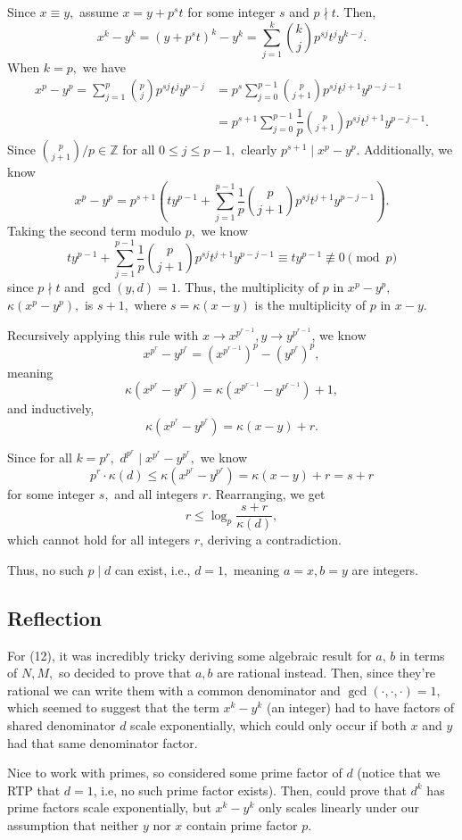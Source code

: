 \documentclass[12pt]{article}
\begin{document}
\begin{enumerate}
    Since $x \equiv y,$ assume $x = y + p^s t$ for some integer $s$
    and $p \nmid t.$ Then, $$x^k - y^k = (y + p^st)^k - y^k = \sum_{j
    = 1}^{k}{k \choose j}p^{sj}t^j y^{k -j}.$$
    When $k = p,$ we have
    \begin{align*}
      x^p - y^p = \sum_{j = 1}^{p}{p \choose j} p^{sj} t^j y^{p -j}
      &= p^{s} \sum_{j = 0}^{p - 1}{p \choose j + 1} p^{sj} t^{j + 1}
      y^{p-j - 1} \\
      &= p^{s+1} \sum_{j = 0}^{p-1} \dfrac{1}p{}{p \choose j + 1}
      p^{sj} t^{j + 1} y^{p -j - 1}.
    \end{align*}
    Since ${p \choose j + 1} / p \in \mathbb Z$ for all $0 \leq j
    \leq p - 1,$ clearly $p^{s + 1} \mid x^p - y^p.$ Additionally, we know
    $$
    x^p -y^p = p^{s + 1} \left (
      ty^{p-1} + \sum_{j = 1}^{p-1} \dfrac{1}{p}{p \choose j + 1}
      p^{sj} t^{j + 1} y^{p -j - 1}
    \right).
    $$
    Taking the second term modulo $p,$ we know
    $$
    ty^{p-1} + \sum_{j = 1}^{p-1} \dfrac{1}{p} {p \choose j + 1}
    p^{sj} t^{j + 1} y^{p -j - 1} \equiv ty^{p - 1}  \not \equiv 0 \pmod{p}
    $$
    since $p \nmid t$ and $\gcd(y, d) = 1.$ Thus, the multiplicity of
    $p$ in $x^p - y^p, $ $\kappa(x^p - y^p),$ is $s + 1,$ where $s =
    \kappa(x - y)$ is the multiplicity of $p$ in $x - y.$

    Recursively applying this rule with $x \to x^{p^{r - 1}}, y \to
    y^{p^{r - 1}}$, we know
    $$
    x^{p^r} - y^{p^r} = (x^{p ^{r-1}})^{p} -(y^{p^{r}})^{p},
    $$
    meaning
    $$
    \kappa(x^{p^r} - y^{p^r}) = \kappa(x^{p^{r-1}} - y^{p^{r-1}}) + 1,
    $$
    and inductively,
    $$
    \kappa(x^{p^r} - y^{p^r}) = \kappa(x - y) + r.
    $$

    Since for all $k = p^r,$ $d^{p^r} \mid x^{p^r} - y^{p^r},$ we know
    $$
    p^r \cdot \kappa(d) \leq \kappa(x^{p^r} - y^{p^r}) = \kappa(x -
    y) + r = s + r
    $$
    for some integer $s,$ and all integers $r.$ Rearranging, we get
    $$
    r \leq \log_{p}\dfrac{s + r}{\kappa(d)},
    $$
    which cannot hold for all integers $r$, deriving a contradiction.

    Thus, no such $p \mid d$ can exist, i.e., $d = 1,$ meaning $a =
    x, b = y$ are integers.
\end{enumerate}

\subsection{Reflection}
For (12), it was incredibly tricky deriving some algebraic result for
$a$, $b$ in terms of $N, M,$ so decided to prove that $a, b$ are
rational instead. Then, since they're rational we can write them with
a common denominator and $\gcd(\cdot, \cdot, \cdot) = 1,$ which
seemed to suggest that the term $x^k - y^k$ (an integer) had to have
factors of shared denominator $d$ scale exponentially, which could
only occur if both $x$ and $y$ had that same denominator factor.

Nice to work with primes, so considered some prime factor of $d$
(notice that we RTP that $d = 1$, i.e, no such prime factor exists).
Then, could prove that $d^k$ has prime factors scale exponentially,
but $x^k - y^k$ only scales linearly under our assumption that
neither $y$ nor $x$ contain prime factor $p.$
\end{document}

